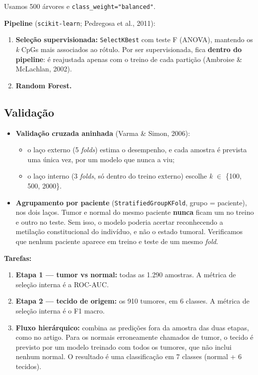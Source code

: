 \documentclass[11pt,a4paper]{article}
\providecommand{\tightlist}{\setlength{\itemsep}{0pt}\setlength{\parskip}{0pt}}
\begin{document}
Usamos 500 árvores e \texttt{class\_weight="balanced"}.

\textbf{Pipeline} (\texttt{scikit-learn}; Pedregosa et al., 2011):

\begin{enumerate}
\def\labelenumi{\arabic{enumi}.}
\tightlist
\item
  \textbf{Seleção supervisionada:} \texttt{SelectKBest} com teste F (ANOVA),
  mantendo os \emph{k} CpGs mais associados ao rótulo. Por ser supervisionada,
  fica \textbf{dentro do pipeline}: é reajustada apenas com o treino de cada
  partição (Ambroise \& McLachlan, 2002).
\item
  \textbf{Random Forest.}
\end{enumerate}

\subsection{Validação}

\begin{itemize}
\tightlist
\item
  \textbf{Validação cruzada aninhada} (Varma \& Simon, 2006):

  \begin{itemize}
  \tightlist
  \item
    o laço externo (5 \emph{folds}) estima o desempenho, e cada amostra é
    prevista uma única vez, por um modelo que nunca a viu;
  \item
    o laço interno (3 \emph{folds}, só dentro do treino externo) escolhe
    \emph{k} $\in$ \{100, 500, 2000\}.
  \end{itemize}
\item
  \textbf{Agrupamento por paciente} (\texttt{StratifiedGroupKFold}, grupo =
  paciente), nos dois laços. Tumor e normal do mesmo paciente \textbf{nunca}
  ficam um no treino e outro no teste. Sem isso, o modelo poderia acertar
  reconhecendo a metilação constitucional do indivíduo, e não o estado tumoral.
  Verificamos que nenhum paciente aparece em treino e teste de um mesmo
  \emph{fold}.
\end{itemize}

\textbf{Tarefas:}

\begin{enumerate}
\def\labelenumi{\arabic{enumi}.}
\tightlist
\item
  \textbf{Etapa 1 --- tumor vs normal:} todas as 1.290 amostras. A métrica de
  seleção interna é a ROC-AUC.
\item
  \textbf{Etapa 2 --- tecido de origem:} os 910 tumores, em 6 classes. A métrica
  de seleção interna é o F1 macro.
\item
  \textbf{Fluxo hierárquico:} combina as predições fora da amostra das duas
  etapas, como no artigo. Para os normais erroneamente chamados de tumor, o
  tecido é previsto por um modelo treinado com todos os tumores, que não inclui
  nenhum normal. O resultado é uma classificação em 7 classes (normal + 6
  tecidos).
\end{enumerate}
\end{document}
